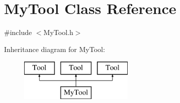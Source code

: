 \hypertarget{classMyTool}{\section{My\-Tool Class Reference}
\label{classMyTool}
}


{\ttfamily \#include $<$My\-Tool.\-h$>$}

Inheritance diagram for My\-Tool\-:\begin{figure}[H]
\begin{center}
\leavevmode
\includegraphics[height=2.000000cm]{classMyTool}
\end{center}
\end{figure}
